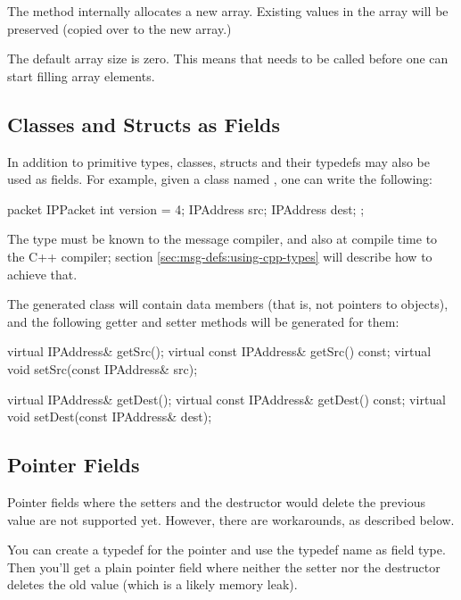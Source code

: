 The  method internally allocates a new array. Existing
values in the array will be preserved (copied over to the new array.)

The default array size is zero. This means that  needs
to be called before one can start filling array elements.


\subsection{Classes and Structs as Fields}
\label{sec:msg-defs:other-types-as-fields}

In addition to primitive types, classes, structs and their typedefs may
also be used as fields. For example, given a class named ,
one can write the following:

\begin{msg}
packet IPPacket
{
    int version = 4;
    IPAddress src;
    IPAddress dest;
};
\end{msg}

The  type must be known to the message compiler, and
also at compile time to the C++ compiler; section
\ref{sec:msg-defs:using-cpp-types} will describe how to achieve that.

The generated class will contain  data members
(that is, not pointers to  objects), and
the following getter and setter methods will be generated for them:

\begin{cpp}
virtual IPAddress& getSrc();
virtual const IPAddress& getSrc() const;
virtual void setSrc(const IPAddress& src);

virtual IPAddress& getDest();
virtual const IPAddress& getDest() const;
virtual void setDest(const IPAddress& dest);
\end{cpp}


\subsection{Pointer Fields}
\label{sec:msg-defs:pointers-fields}

Pointer fields where the setters and the destructor would delete the
previous value are not supported yet. However, there are workarounds, as
described below.

You can create a typedef for the pointer and use the typedef name as field
type. Then you'll get a plain pointer field where neither the setter nor
the destructor deletes the old value (which is a likely memory leak).

